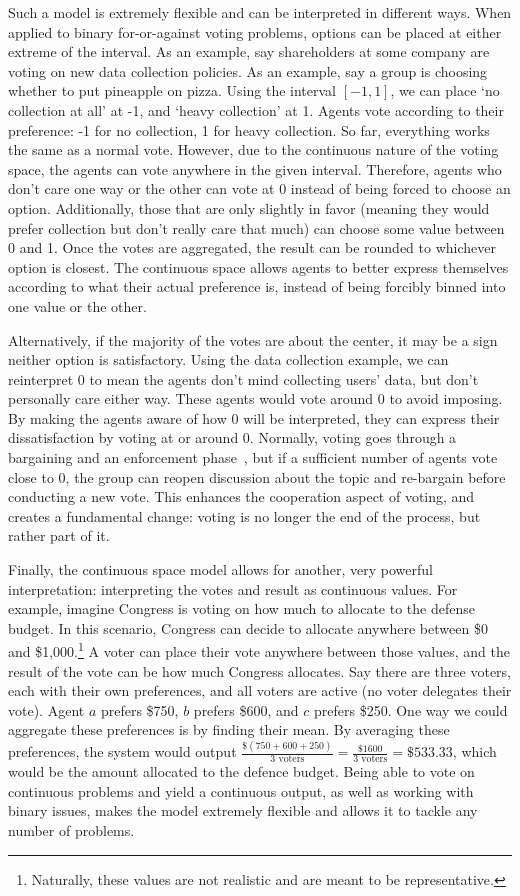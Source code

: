Such a model is extremely flexible and can be interpreted in different ways.
When applied to binary for-or-against voting problems, options can be placed at either
extreme of the interval.
As an example, say shareholders at some company are voting on new data collection
policies.
As an example, say a group is choosing whether to put pineapple on pizza.
Using the interval $[-1, 1]$, we can place `no collection at all' at -1, and `heavy
collection' at 1.
Agents vote according to their preference: -1 for no collection, 1 for heavy collection.
So far, everything works the same as a normal vote.
However, due to the continuous nature of the voting space, the agents can vote
anywhere in the given interval.
Therefore, agents who don't care one way or the other can vote at 0 instead of being
forced to choose an option.
Additionally, those that are only slightly in favor (meaning they would prefer
collection but don't really care that much) can choose some value between 0 and 1.
Once the votes are aggregated, the result can be rounded to whichever option is
closest.
The continuous space allows agents to better express themselves according to what
their actual preference is, instead of being forcibly binned into one value or the
other.

Alternatively, if the majority of the votes are about the center, it may be a sign
neither option is satisfactory.
Using the data collection example, we can reinterpret 0 to mean the agents don't
mind collecting users' data, but don't personally care either way.
These agents would vote around 0 to avoid imposing.
By making the agents aware of how 0 will be interpreted, they can express their
dissatisfaction by voting at or around 0.
Normally, voting goes through a bargaining and an enforcement
phase~\cite{Fearon1998}, but if a sufficient number of agents vote close to 0, the
group can reopen discussion about the topic and re-bargain before conducting a new vote.
This enhances the cooperation aspect of voting, and creates a fundamental change:
voting is no longer the end of the process, but rather part of it.

Finally, the continuous space model allows for another, very powerful interpretation:
interpreting the votes and result as continuous values.
For example, imagine Congress is voting on how much to allocate to the defense budget.
In this scenario, Congress can decide to allocate anywhere between \$0 and \$1,000.\footnote{
    Naturally, these values are not realistic and are meant to be representative.
}
A voter can place their vote anywhere between those values, and the result of the
vote can be how much Congress allocates.
Say there are three voters, each with their own preferences, and all voters are
active (no voter delegates their vote).
Agent $a$ prefers \$750, $b$ prefers \$600, and $c$ prefers \$250.
One way we could aggregate these preferences is by finding their mean.
By averaging these preferences, the system would output
$\frac{\$(750 + 600 + 250)}{3 \text{ voters}} = \frac{\$1600}{3 \text{ voters}} =
\$533.33$,
which would be the amount allocated to the defence budget.
Being able to vote on continuous problems and yield a continuous output, as well as
working with binary issues, makes the model extremely flexible and allows it to
tackle any number of problems.

